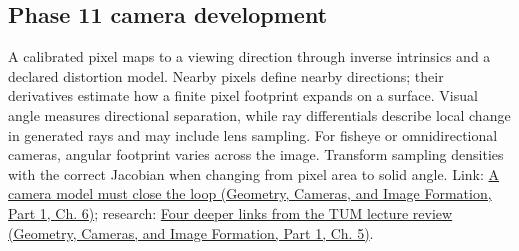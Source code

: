 \subsection{Phase 11 camera development}\label{appendix-7d356c396d1a-phase-11-camera-development}

\hypertarget{appendix-7d356c396d1a-phase-11-camera-development}{}

A calibrated pixel maps to a viewing direction through inverse intrinsics and a declared distortion model. Nearby pixels define nearby directions; their derivatives estimate how a finite pixel footprint expands on a surface. Visual angle measures directional separation, while ray differentials describe local change in generated rays and may include lens sampling. For fisheye or omnidirectional cameras, angular footprint varies across the image. Transform sampling densities with the correct Jacobian when changing from pixel area to solid angle. Link: \href{../03-Geometry-Cameras-and-Image-Formation-P01/main.pdf\#02-foundations-ii-ch037-a-camera-model-must-close-the-loop}{A camera model must close the loop (Geometry, Cameras, and Image Formation, Part 1, Ch. 6)}; research: \href{../03-Geometry-Cameras-and-Image-Formation-P01/main.pdf\#02-foundations-ii-ch036-four-deeper-links-from-the-tum-lecture-review}{Four deeper links from the TUM lecture review (Geometry, Cameras, and Image Formation, Part 1, Ch. 5)}.
